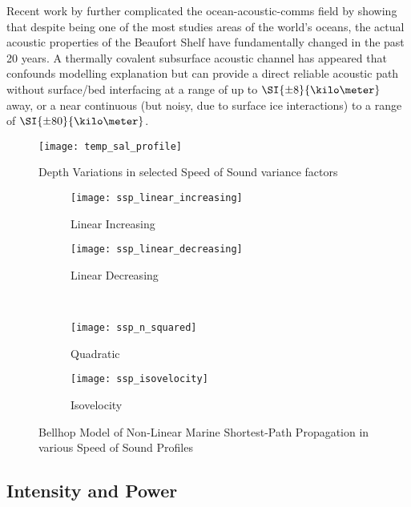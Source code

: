 Recent work by \citet{Schmidt2016} further complicated the ocean-acoustic-comms field by showing that despite being one of the most studies areas of the world's oceans, the actual acoustic properties of the Beaufort Shelf have fundamentally changed in the past 20 years.
A thermally covalent subsurface acoustic channel has appeared that confounds modelling explanation but can provide a direct reliable acoustic path without surface/bed interfacing at a range of up to $\SI{\pm8}{\kilo\meter}$ away, or a near continuous (but noisy, due to surface ice interactions) to a range of $\SI{\pm80}{\kilo\meter}$.



\begin{figure}
	\centering
	\texttt{[image: temp\_sal\_profile]}
	\caption{Depth Variations in selected Speed of Sound variance factors}
	\label{fig:temp_sal_profile}
\end{figure}


\begin{figure}
	\begin{subfigure}[t]{0.45\textwidth}
		\centering
		\texttt{[image: ssp\_linear\_increasing]}
		\caption{Linear Increasing}
		\label{fig:ssp_linear_increasing}
	\end{subfigure}
	\begin{subfigure}[t]{0.45\textwidth}
		\centering
		\texttt{[image: ssp\_linear\_decreasing]}
		\caption{Linear Decreasing}
		\label{fig:ssp_linear_decreasing}
	\end{subfigure}\\
	\begin{subfigure}[t]{0.45\textwidth}
		\centering
		\texttt{[image: ssp\_n\_squared]}
		\caption{Quadratic}
		\label{fig:ssp_n_squared}
	\end{subfigure}
	\begin{subfigure}[t]{0.45\textwidth}
		\centering
		\texttt{[image: ssp\_isovelocity]}
		\caption{Isovelocity}
		\label{fig:ssp_isovelocity}
	\end{subfigure}
	\caption{Bellhop Model of Non-Linear Marine Shortest-Path Propagation in various Speed of Sound Profiles}
	\label{fig:ssps}
\end{figure}

\subsection{Intensity and Power} 

